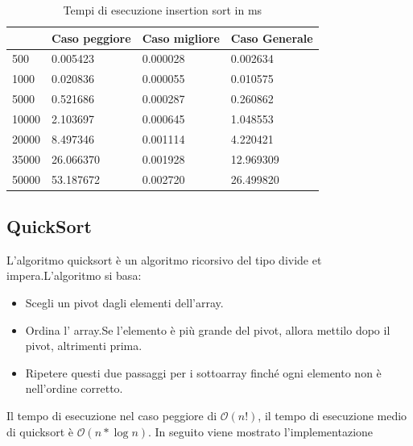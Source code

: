 \documentclass[12pt,a4paper]{report}
\begin{document}
\begin{table}[ht]
\centering
\begin{tabular}{| l | l | l | l |}
\hline
           & Caso peggiore & Caso migliore & Caso Generale \\ \hline
500   & 0.005423      & 0.000028      & 0.002634      \\ \hline
1000  & 0.020836	    & 0.000055      & 0.010575      \\ \hline
5000  & 0.521686      & 0.000287     & 0.260862     \\ \hline
10000 & 2.103697      & 0.000645     & 1.048553      \\ \hline
20000 & 8.497346     & 0.001114      & 4.220421     \\ \hline
35000 & 26.066370     & 0.001928     & 12.969309     \\ \hline
50000 & 53.187672     & 0.002720   & 26.499820    \\ \hline

\end{tabular}
\caption{Tempi di esecuzione insertion sort in ms}
\label{Tab:Tempi esecuzione InsertionSort}
\end{table}


\subsection{QuickSort}
L'algoritmo quicksort è un algoritmo ricorsivo del tipo divide et impera.L'algoritmo si basa:

\begin{itemize}
\item Scegli un pivot dagli elementi dell'array.
\item Ordina l' array.Se l'elemento è più grande del pivot, allora mettilo  dopo il pivot, altrimenti prima.
\item Ripetere questi due passaggi per i sottoarray finché ogni elemento non è nell'ordine corretto.
\end{itemize}

Il tempo di esecuzione nel caso peggiore di $\mathcal{O}(n!) $, il tempo di esecuzione medio di quicksort è $\mathcal{O}(n * \log{}n) $. In seguito viene mostrato l'implementazione 

	
\end{document}
